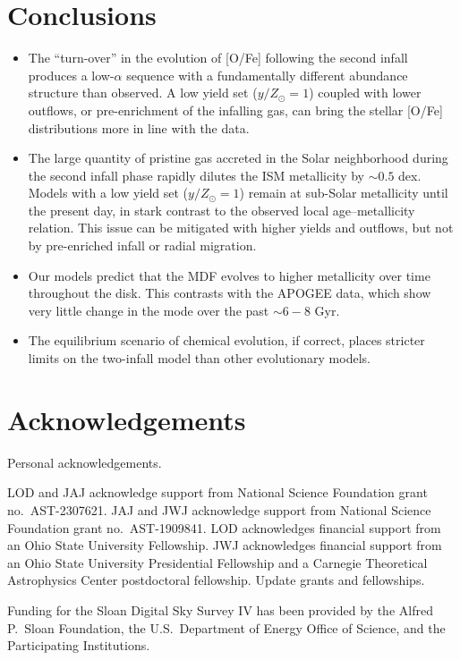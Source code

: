 \documentclass[twocolumn,twocolappendix,linenumbers]{aastex631}
\newcommand{\todo}[1]{{\color{red}#1}}
\begin{document}
\section{Conclusions}
\label{sec:conclusions}

\begin{itemize}
    \item The ``turn-over'' in the evolution of [O/Fe] following the second infall produces a low-$\alpha$ sequence with a fundamentally different abundance structure than observed. A low yield set ($y/Z_\odot=1$) coupled with lower outflows, or pre-enrichment of the infalling gas, can bring the stellar [O/Fe] distributions more in line with the data.
    \item The large quantity of pristine gas accreted in the Solar neighborhood during the second infall phase rapidly dilutes the ISM metallicity by $\sim0.5$ dex. Models with a low yield set ($y/Z_\odot=1$) remain at sub-Solar metallicity until the present day, in stark contrast to the observed local age--metallicity relation. This issue can be mitigated with higher yields and outflows, but not by pre-enriched infall or radial migration.
    \item Our models predict that the MDF evolves to higher metallicity over time throughout the disk. This contrasts with the APOGEE data, which show very little change in the mode over the past $\sim6-8$ Gyr.
    \item The equilibrium scenario of chemical evolution, if correct, places stricter limits on the two-infall model than other evolutionary models.
\end{itemize}

\section*{Acknowledgements}

\todo{Personal acknowledgements.}

LOD and JAJ acknowledge support from National Science Foundation grant no.\ AST-2307621. JAJ and JWJ acknowledge support from National Science Foundation grant no.\ AST-1909841.
LOD acknowledges financial support from an Ohio State University Fellowship.
JWJ acknowledges financial support from an Ohio State University Presidential Fellowship and a Carnegie Theoretical Astrophysics Center postdoctoral fellowship. \todo{Update grants and fellowships.}

Funding for the Sloan Digital Sky 
Survey IV has been provided by the 
Alfred P.\ Sloan Foundation, the U.S.\ 
Department of Energy Office of 
Science, and the Participating 
Institutions. 
\end{document}
